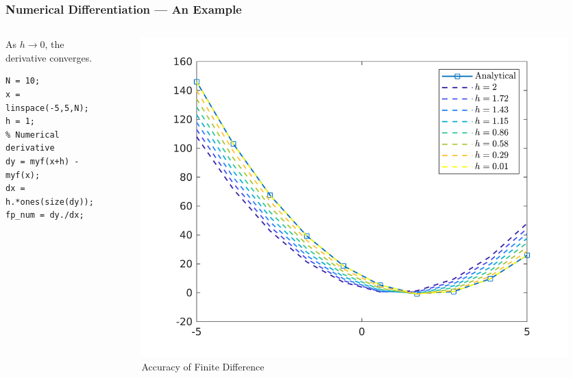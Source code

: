 \documentclass[11pt,xcolor={svgnames},aspectratio=169,usepdftitle=false,notheorems]{beamer}
\begin{document}
\begin{frame}[fragile]
  \frametitle{Numerical Differentiation --- An Example}
\begin{columns}
\begin{column}{0.38\textwidth}
{\footnotesize As $h\rightarrow 0$, the derivative converges.}
\begin{lstlisting}
N = 10;
x = linspace(-5,5,N);
h = 1;
% Numerical derivative
dy = myf(x+h) - myf(x);
dx = h.*ones(size(dy));
fp_num = dy./dx;
\end{lstlisting}
\end{column}
\begin{column}{0.61\textwidth}
  \begin{figure}
    \centering
    \includegraphics[width = \textwidth]{../figures/finite_differences.png}
    \caption{Accuracy of Finite Difference}
    \label{fig:finite_differences}
  \end{figure}
\end{column}
\end{columns}
\end{frame}
\end{document}
